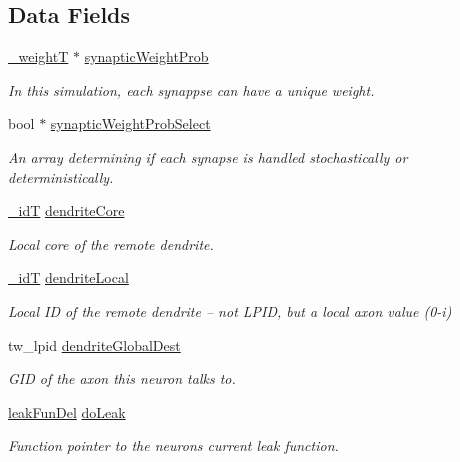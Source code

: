 \subsection*{Data Fields}
\begin{DoxyCompactItemize}
\item 
\hyperlink{assist_8h_aa73c5ea0fe4ba938c96e6771b38dcb2a}{\+\_\+weight\+T} $\ast$ \hyperlink{structneuron_state_aa71c0acf1edf08865e1f9729a2414efa}{synaptic\+Weight\+Prob}
\begin{DoxyCompactList}\small\item\em In this simulation, each synappse can have a unique weight. \end{DoxyCompactList}\item 
bool $\ast$ \hyperlink{structneuron_state_a4568f103808a436a62d7c7c47dc90e9b}{synaptic\+Weight\+Prob\+Select}
\begin{DoxyCompactList}\small\item\em An array determining if each synapse is handled stochastically or deterministically. \end{DoxyCompactList}\item 
\hyperlink{assist_8h_a3f7a6e6a1210b6d9d7a42177dcb9634b}{\+\_\+id\+T} \hyperlink{structneuron_state_a62463fa4d33c39297aa5ce3a145d474f}{dendrite\+Core}
\begin{DoxyCompactList}\small\item\em Local core of the remote dendrite. \end{DoxyCompactList}\item 
\hyperlink{assist_8h_a3f7a6e6a1210b6d9d7a42177dcb9634b}{\+\_\+id\+T} \hyperlink{structneuron_state_a73e5b16411af572181411b8fd8d5117d}{dendrite\+Local}
\begin{DoxyCompactList}\small\item\em Local I\+D of the remote dendrite -- not L\+P\+I\+D, but a local axon value (0-\/i) \end{DoxyCompactList}\item 
tw\+\_\+lpid \hyperlink{structneuron_state_a4199c14c5aabfd52f441e01623bdc84c}{dendrite\+Global\+Dest}
\begin{DoxyCompactList}\small\item\em G\+I\+D of the axon this neuron talks to. \end{DoxyCompactList}\item 
\hyperlink{structleak_fun_del}{leak\+Fun\+Del} \hyperlink{structneuron_state_aa430f424f34dc59dc27736e27ec61320}{do\+Leak}
\begin{DoxyCompactList}\small\item\em Function pointer to the neuron\textquotesingle{}s current leak function. \end{DoxyCompactList}\item 

\end{DoxyCompactItemize}
